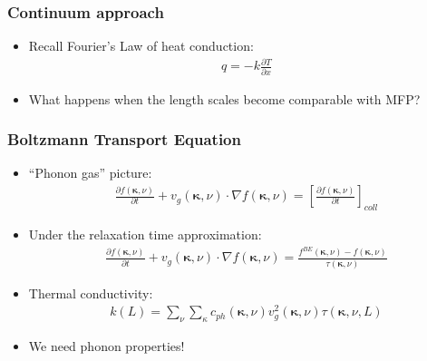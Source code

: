 \documentclass[]{beamer}
\begin{document}
\begin{frame}
  \frametitle{Continuum approach}   %

  \begin{itemize}
  \item Recall Fourier's Law of heat conduction:
	\begin{align*}
		q=-k\frac{\partial T}{\partial x}
	\end{align*}
  \item What happens when the length scales become comparable with MFP?
  \end{itemize}
\end{frame}

\begin{frame}
  \frametitle{Boltzmann Transport Equation}   %

  \begin{itemize}
  \item ``Phonon gas'' picture:
\begin{align*}
	\frac{\partial f(\pmb{\kappa}, \nu)}{\partial t}+v_g(\pmb{\kappa}, \nu)\cdot\nabla f(\pmb{\kappa}, \nu)= [\frac{\partial f(\pmb{\kappa}, \nu)}{\partial t}]_{coll}
\end{align*}
  \item Under the relaxation time approximation:
\begin{align*}
	\frac{\partial f(\pmb{\kappa}, \nu)}{\partial t}+v_g(\pmb{\kappa}, \nu)\cdot\nabla f(\pmb{\kappa}, \nu)= \frac{f^{BE}(\pmb{\kappa}, \nu)-f(\pmb{\kappa}, \nu)}{\tau(\pmb{\kappa}, \nu)}
\end{align*}
  \item Thermal conductivity:
	\begin{align*}
		k(L)=\sum_\nu \sum_\kappa c_{ph}(\pmb{\kappa},\nu)v^2_g(\pmb{\kappa}, \nu)\tau(\pmb{\kappa}, \nu,L)
	\end{align*}
  \item We need phonon properties!
  \end{itemize}
\end{frame}
\end{document}
